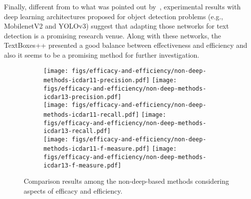 Finally, different from to what was pointed out by~\cite{Ye2015PAMI}, experimental results with deep learning architectures proposed for object detection problems (e.g., MobilenetV2 and YOLOv3) suggest that adapting those networks for text detection is a promising research venue. Along with these networks, the TextBoxes++ presented a good balance between effectiveness and efficiency and also it seems to be a promising method for further investigation.

%
\begin{figure}[H]
    \centering
    \begin{subfigure}[t]{0.98\textwidth}
        \centering
        \texttt{[image: figs/efficacy-and-efficiency/non-deep-methods-icdar11-precision.pdf]}
        \texttt{[image: figs/efficacy-and-efficiency/non-deep-methods-icdar13-precision.pdf]} \\
        \texttt{[image: figs/efficacy-and-efficiency/non-deep-methods-icdar11-recall.pdf]}
        \texttt{[image: figs/efficacy-and-efficiency/non-deep-methods-icdar13-recall.pdf]} \\
        \texttt{[image: figs/efficacy-and-efficiency/non-deep-methods-icdar11-f-measure.pdf]}
        \texttt{[image: figs/efficacy-and-efficiency/non-deep-methods-icdar13-f-measure.pdf]}
    \end{subfigure}
    \caption{Comparison results among the non-deep-based methods considering aspects of efficacy and efficiency.}
    \label{fig:non-deep-methods-efficacy-and-efficiency}
\end{figure}
%
